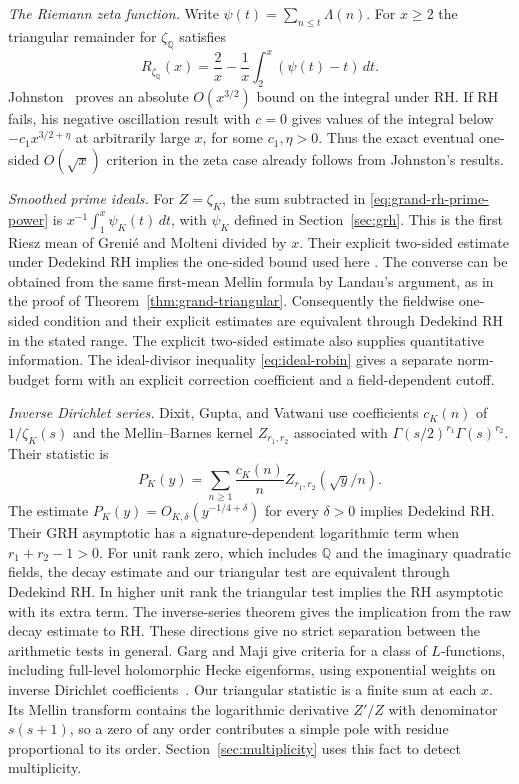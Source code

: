 \documentclass[11pt]{amsart}
\theoremstyle{definition}
\theoremstyle{remark}
\numberwithin{equation}{section}
\begin{document}
\emph{The Riemann zeta function.} Write
\(\psi(t)=\sum_{n\leq t}\Lambda(n)\). For \(x\geq2\) the
triangular remainder for \(\zeta_{\mathbb Q}\) satisfies
\[
 R_{\zeta_{\mathbb Q}}(x)=\frac{2}{x}
       -\frac{1}{x}\int_2^x(\psi(t)-t)\,dt .
\]
Johnston~\cite[Lemmas~2.6 and~2.8 in the arXiv version]{JohnstonAveragePrimeCount}
proves an absolute \(O(x^{3/2})\) bound on the integral under RH.
If RH fails, his negative oscillation result with \(c=0\) gives
values of the integral below \(-c_1 x^{3/2+\eta}\) at arbitrarily
large \(x\), for some \(c_1,\eta>0\). Thus the exact eventual
one-sided \(O(\sqrt{x})\) criterion in the zeta case already follows
from Johnston's results.

\emph{Smoothed prime ideals.} For \(Z=\zeta_K\), the sum subtracted in
\eqref{eq:grand-rh-prime-power} is
\(x^{-1}\int_1^x\psi_K(t)\,dt\), with \(\psi_K\) defined in
Section~\ref{sec:grh}. This is the first Riesz mean of Greni\'e and
Molteni divided by \(x\). Their explicit two-sided estimate under
Dedekind RH implies the one-sided bound used here
\cite[Theorem~1.1]{GrenieMolteniSmoothed}. The converse can be obtained
from the same first-mean Mellin formula by Landau's argument, as in
the proof of Theorem~\ref{thm:grand-triangular}. Consequently the
fieldwise one-sided condition and their explicit estimates are
equivalent through Dedekind RH in the stated range. The explicit
two-sided estimate also supplies quantitative information. The
ideal-divisor inequality \eqref{eq:ideal-robin} gives a separate
norm-budget form with an explicit correction coefficient and a
field-dependent cutoff.

\emph{Inverse Dirichlet series.} Dixit, Gupta, and Vatwani
\cite[Theorem~1.4]{DixitGuptaVatwani2022} use coefficients \(c_K(n)\)
of \(1/\zeta_K(s)\) and the Mellin--Barnes kernel \(Z_{r_1,r_2}\)
associated with \(\Gamma(s/2)^{r_1}\Gamma(s)^{r_2}\).
Their statistic is
\[
 P_K(y)=\sum_{n\geq1}\frac{c_K(n)}{n}
            Z_{r_1,r_2}(\sqrt{y}/n).
\]
The estimate \(P_K(y)=O_{K,\delta}(y^{-1/4+\delta})\) for every
\(\delta>0\) implies Dedekind RH. Their GRH asymptotic has a
signature-dependent logarithmic term when \(r_1+r_2-1>0\).
For unit rank zero, which includes \(\mathbb Q\) and the
imaginary quadratic fields, the decay estimate and our triangular
test are equivalent through Dedekind RH. In higher unit rank the
triangular test implies the RH asymptotic with its extra term.
The inverse-series theorem gives the implication from the raw
decay estimate to RH. These directions give no strict separation
between the arithmetic tests in general.
Garg and Maji give criteria for a class of \(L\)-functions, including
full-level holomorphic Hecke eigenforms, using exponential weights on
inverse Dirichlet coefficients~\cite[Theorem~3.10 and
Corollary~3.12]{GargMajiGrand}. Our triangular statistic is a finite
sum at each \(x\). Its Mellin transform contains the logarithmic
derivative \(Z'/Z\) with denominator \(s(s+1)\), so a zero of any order
contributes a simple pole with residue proportional to its order.
Section~\ref{sec:multiplicity} uses this fact to detect multiplicity.
\end{document}
